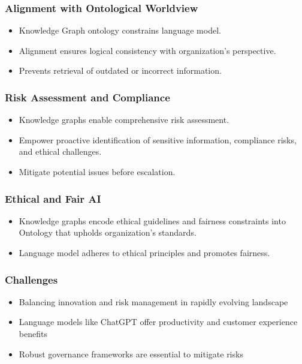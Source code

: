 \begin{frame}[fragile]\frametitle{Alignment with Ontological Worldview}
\begin{itemize}
\item Knowledge Graph ontology constrains language model.
\item Alignment ensures logical consistency with organization's perspective.
\item Prevents retrieval of outdated or incorrect information.
\end{itemize}
\end{frame}

\begin{frame}[fragile]\frametitle{Risk Assessment and Compliance}
\begin{itemize}
\item Knowledge graphs enable comprehensive risk assessment.
\item Empower proactive identification of sensitive information, compliance risks, and ethical challenges.
\item Mitigate potential issues before escalation.
\end{itemize}
\end{frame}

\begin{frame}[fragile]\frametitle{Ethical and Fair AI}
\begin{itemize}
\item Knowledge graphs encode ethical guidelines and fairness constraints into Ontology that upholds organization's standards.
\item Language model adheres to ethical principles and promotes fairness.
\end{itemize}
\end{frame}

\begin{frame}[fragile]\frametitle{Challenges}
\begin{itemize}
\item Balancing innovation and risk management in rapidly evolving landscape
\item Language models like ChatGPT offer productivity and customer experience benefits
\item Robust governance frameworks are essential to mitigate risks
\end{itemize}
\end{frame}

